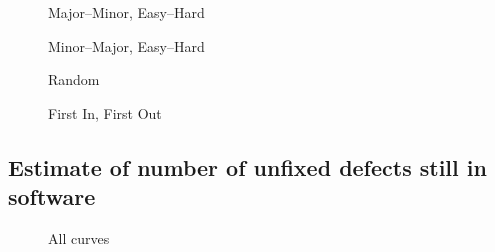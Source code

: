 \documentclass[a4paper,10pt]{article}
\begin{document}
\begin{appendices}
  \begin{figure}[!htb]
    \centering
    
    \caption{Major--Minor, Easy--Hard}
  \end{figure}
  
  \begin{figure}[!htb]
    \centering
    
    \caption{Minor--Major, Easy--Hard}
  \end{figure}
  
  \begin{figure}[!htb]
    \centering
    
    \caption{Random}
  \end{figure}
  
  \begin{figure}[!htb]
    \centering
    
    \caption{First In, First Out}
  \end{figure}
  
  
  \clearpage
  \subsection{Estimate of number of unfixed defects still in software}
  \begin{figure}[!htb]
    \centering
    
    \caption{All curves}
  \end{figure}
  
  

\end{appendices}
\end{document}
